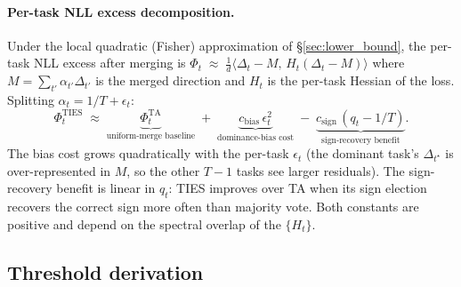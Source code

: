 \paragraph{Per-task NLL excess decomposition.}
Under the local quadratic (Fisher) approximation of
\S\ref{sec:lower_bound}, the per-task NLL excess after merging is
$\Phi_t \;\approx\; \tfrac{1}{d} \big\langle \Delta_t - M,\, H_t (\Delta_t - M)\big\rangle$
where $M = \sum_{t'} \alpha_{t'} \Delta_{t'}$ is the merged direction
and $H_t$ is the per-task Hessian of the loss. Splitting $\alpha_t =
1/T + \epsilon_t$:
\begin{equation}
  \Phi_t^{\mathrm{TIES}}
  \;\approx\;
  \underbrace{\Phi_t^{\mathrm{TA}}}_{\text{uniform-merge baseline}}
  \;+\;
  \underbrace{c_{\mathrm{bias}}\, \epsilon_t^2}_{\text{dominance-bias cost}}
  \;-\;
  \underbrace{c_{\mathrm{sign}}\, (q_t - 1/T)}_{\text{sign-recovery benefit}}.
  \label{eq:excess-decomp}
\end{equation}
The bias cost grows quadratically with the per-task $\epsilon_t$ (the
dominant task's $\Delta_{t^\star}$ is over-represented in $M$, so the
other $T-1$ tasks see larger residuals). The sign-recovery benefit is
linear in $q_t$: TIES improves over TA when its sign election recovers
the correct sign more often than majority vote. Both constants are
positive and depend on the spectral overlap of the $\{H_t\}$.

\subsection{Threshold derivation}


